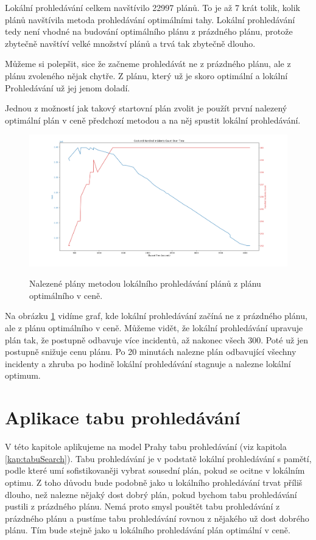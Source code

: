 Lokální prohledávání celkem navštívilo 22997 plánů. To je až 7 krát tolik, kolik plánů navštívila metoda prohledávání optimálními tahy.
Lokální prohledávání tedy není vhodné na budování optimálního plánu z prázdného plánu, protože zbytečně navštíví velké množství plánů a trvá tak zbytečně dlouho.

Můžeme si polepšit, sice že začneme prohledávát ne z prázdného plánu, ale z plánu zvoleného nějak chytře. Z plánu, který už je skoro optimální a lokální Prohledávání
už jej jenom doladí.

Jednou z možností jak takový startovní plán zvolit je použít první nalezený optimální plán v ceně předchozí metodou a na něj spustit lokální prohledávání.

\begin{figure}[H]
  \caption{Nalezené plány metodou lokálního prohledávání plánů z plánu optimálního v ceně.}
  \includegraphics[width=\textwidth]{img/hybrid_prague.png}
  \centering
  \label{img:hybrid}
\end{figure}

Na obrázku \ref{img:hybrid} vidíme graf, kde lokální prohledávání začíná ne z prázdného plánu, ale z plánu optimálního v ceně.
Můžeme vidět, že lokální prohledávání upravuje plán tak, že postupně odbavuje více incidentů, až nakonec všech 300. Poté už jen postupně snižuje cenu plánu.
Po 20 minutách nalezne plán odbavující všechny incidenty a zhruba po hodině lokální prohledávání stagnuje a nalezne lokální optimum.


\section{Aplikace tabu prohledávání}

V této kapitole aplikujeme na model Prahy tabu prohledávání (viz kapitola \ref{kap:tabuSearch}).
Tabu prohledávání je v podstatě lokální prohledávání s pamětí, podle které umí sofistikovaněji vybrat sousední plán,
pokud se ocitne v lokálním optimu.
Z toho důvodu bude podobně jako u lokálního prohledávání trvat příliš dlouho, než nalezne nějaký dost dobrý plán, pokud bychom tabu prohledávání pustili z prázdného plánu.
Nemá proto smysl pouštět tabu prohledávání z prázdného plánu a pustíme tabu prohledávání rovnou z nějakého už dost dobrého plánu.
Tím bude stejně jako u lokálního prohledávání plán optimální v ceně.


